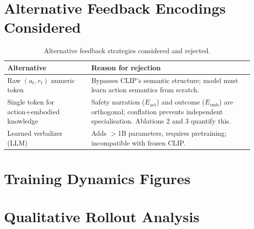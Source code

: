 \documentclass{article}
\newcommand{\Lact}{$E_{\mathrm{act}}$\xspace}
\newcommand{\Lexp}{$E_{\mathrm{emb}}$\xspace}
\begin{document}
\section{Alternative Feedback Encodings Considered}
\label{app:alternatives}

\begin{table}[h]
\centering
\small
\begin{tabular}{L{4cm}L{8cm}}
\toprule
\textbf{Alternative} & \textbf{Reason for rejection} \\
\midrule
Raw $(a_t,r_t)$ numeric token &
  Bypasses CLIP's semantic structure; model must learn action semantics from scratch. \\
Single token for action+embodied knowledge &
  Safety narration (\Lact) and outcome (\Lexp) are orthogonal; conflation prevents
  independent specialisation. Ablations 2 and 3 quantify this. \\
Learned verbalizer (LLM) &
  Adds $>$1B parameters, requires pretraining; incompatible with frozen CLIP. \\
\bottomrule
\end{tabular}
\caption{Alternative feedback strategies considered and rejected.}
\label{tab:alternatives}
\end{table}

\section{Training Dynamics Figures}
\label{app:training_dynamics}



\section{Qualitative Rollout Analysis}
\label{app:qualitative}


\end{document}
